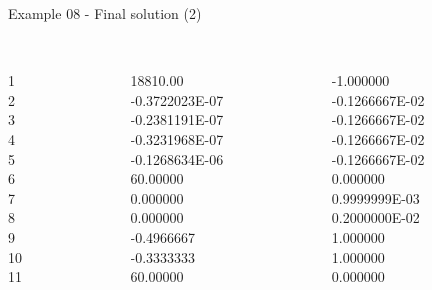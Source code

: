 \begin{frame}{Example 08 - Final solution (2)}
\footnotesize

\begin{columns}[t]
\begin{column}{0.3\textwidth}

\\
1\\
2\\
3\\
4\\
5\\
6\\
7\\
8\\
9\\
10\\
11\\

\end{column}
\begin{column}{0.3\textwidth}
\\
18810.00\\
-0.3722023E-07\\
-0.2381191E-07\\
-0.3231968E-07\\
-0.1268634E-06\\
60.00000\\
0.000000\\
0.000000\\
-0.4966667\\
-0.3333333\\
60.00000\\
\end{column}

\begin{column}{0.3\textwidth}
\\
-1.000000\\
-0.1266667E-02\\
-0.1266667E-02\\
-0.1266667E-02\\
-0.1266667E-02\\
0.000000\\
0.9999999E-03\\
0.2000000E-02\\
1.000000\\
1.000000\\
0.000000\\


\end{column}
\end{columns}

\end{frame}


